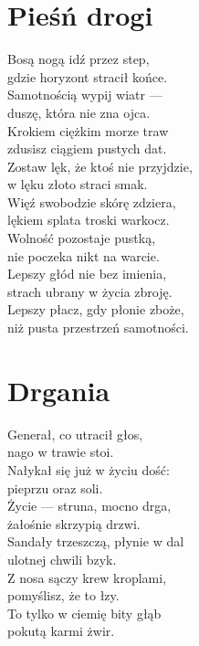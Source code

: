 \documentclass[12pt, a4paper]{memoir}
\renewenvironment{verse}{%
  \par\vspace{\baselineskip}\raggedright
}{
  \par\vspace{\baselineskip}
}
\begin{document}
\newpage
\section{Pieśń drogi}
\begin{verse}
Bosą nogą idź przez step,\\
gdzie horyzont stracił końce.\\
Samotnością wypij wiatr ---\\
duszę, która nie zna ojca.\\[\baselineskip]

Krokiem ciężkim morze traw\\
zdusisz ciągiem pustych dat.\\
Zostaw lęk, że ktoś nie przyjdzie,\\
w lęku złoto straci smak.\\[\baselineskip]

Więź swobodzie skórę zdziera,\\
lękiem splata troski warkocz.\\
Wolność pozostaje pustką,\\
nie poczeka nikt na warcie.\\[\baselineskip]

Lepszy głód nie bez imienia,\\
strach ubrany w życia zbroję.\\
Lepszy płacz, gdy płonie zboże,\\
niż pusta przestrzeń samotności.
\end{verse}

\newpage
\section{Drgania}
\begin{verse}
Generał, co utracił głos,\\
nago w trawie stoi.\\
Nałykał się już w życiu dość:\\
pieprzu oraz soli.\\[\baselineskip]

Życie --- struna, mocno drga,\\
żałośnie skrzypią drzwi.\\
Sandały trzeszczą, płynie w dal\\
ulotnej chwili bzyk.\\[\baselineskip]

Z nosa sączy krew kroplami,\\
pomyślisz, że to łzy.\\
To tylko w ciemię bity głąb\\
pokutą karmi żwir.
\end{verse}
\end{document}
